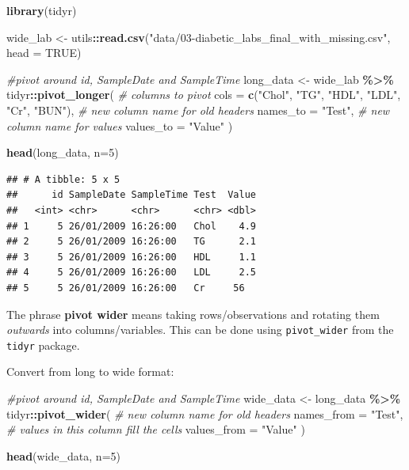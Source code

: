 \documentclass[
]{book}
\newenvironment{Shaded}{\begin{snugshade}}{\end{snugshade}}
\newcommand{\AttributeTok}[1]{\textcolor[rgb]{0.13,0.29,0.53}{#1}}
\newcommand{\CommentTok}[1]{\textcolor[rgb]{0.56,0.35,0.01}{\textit{#1}}}
\newcommand{\ConstantTok}[1]{\textcolor[rgb]{0.56,0.35,0.01}{#1}}
\newcommand{\DecValTok}[1]{\textcolor[rgb]{0.00,0.00,0.81}{#1}}
\newcommand{\FunctionTok}[1]{\textcolor[rgb]{0.13,0.29,0.53}{\textbf{#1}}}
\newcommand{\NormalTok}[1]{#1}
\newcommand{\OtherTok}[1]{\textcolor[rgb]{0.56,0.35,0.01}{#1}}
\newcommand{\SpecialCharTok}[1]{\textcolor[rgb]{0.81,0.36,0.00}{\textbf{#1}}}
\newcommand{\StringTok}[1]{\textcolor[rgb]{0.31,0.60,0.02}{#1}}
\begin{document}
\begin{Shaded}
\begin{Highlighting}[]
\FunctionTok{library}\NormalTok{(tidyr)}
    
\NormalTok{wide\_lab }\OtherTok{\textless{}{-}}\NormalTok{ utils}\SpecialCharTok{::}\FunctionTok{read.csv}\NormalTok{(}\StringTok{"data/03{-}diabetic\_labs\_final\_with\_missing.csv"}\NormalTok{, }\AttributeTok{head =} \ConstantTok{TRUE}\NormalTok{)}

\CommentTok{\#pivot around id, SampleDate and SampleTime}
\NormalTok{long\_data }\OtherTok{\textless{}{-}}\NormalTok{ wide\_lab }\SpecialCharTok{\%\textgreater{}\%}\NormalTok{ tidyr}\SpecialCharTok{::}\FunctionTok{pivot\_longer}\NormalTok{(}
    \CommentTok{\# columns to pivot}
    \AttributeTok{cols =} \FunctionTok{c}\NormalTok{(}\StringTok{"Chol"}\NormalTok{, }\StringTok{"TG"}\NormalTok{, }\StringTok{"HDL"}\NormalTok{, }\StringTok{"LDL"}\NormalTok{, }\StringTok{"Cr"}\NormalTok{, }\StringTok{"BUN"}\NormalTok{), }
    \CommentTok{\# new column name for old headers}
    \AttributeTok{names\_to =} \StringTok{"Test"}\NormalTok{, }
    \CommentTok{\# new column name for values }
    \AttributeTok{values\_to =} \StringTok{"Value"}
\NormalTok{)}

\FunctionTok{head}\NormalTok{(long\_data, }\AttributeTok{n=}\DecValTok{5}\NormalTok{)}
\end{Highlighting}
\end{Shaded}

\begin{verbatim}
## # A tibble: 5 x 5
##      id SampleDate SampleTime Test  Value
##   <int> <chr>      <chr>      <chr> <dbl>
## 1     5 26/01/2009 16:26:00   Chol    4.9
## 2     5 26/01/2009 16:26:00   TG      2.1
## 3     5 26/01/2009 16:26:00   HDL     1.1
## 4     5 26/01/2009 16:26:00   LDL     2.5
## 5     5 26/01/2009 16:26:00   Cr     56
\end{verbatim}

The phrase \textbf{pivot wider} means taking rows/observations and rotating them \emph{outwards} into columns/variables. This can be done using \texttt{pivot\_wider} from the \texttt{tidyr} package.

Convert from long to wide format:

\begin{Shaded}
\begin{Highlighting}[]
\CommentTok{\#pivot around id, SampleDate and SampleTime}
\NormalTok{wide\_data }\OtherTok{\textless{}{-}}\NormalTok{ long\_data }\SpecialCharTok{\%\textgreater{}\%}\NormalTok{ tidyr}\SpecialCharTok{::}\FunctionTok{pivot\_wider}\NormalTok{(}
    \CommentTok{\# new column name for old headers}
    \AttributeTok{names\_from =} \StringTok{"Test"}\NormalTok{, }
    \CommentTok{\# values in this column fill the cells}
    \AttributeTok{values\_from =} \StringTok{"Value"}
\NormalTok{)}

\FunctionTok{head}\NormalTok{(wide\_data, }\AttributeTok{n=}\DecValTok{5}\NormalTok{)}
\end{Highlighting}
\end{Shaded}
\end{document}
